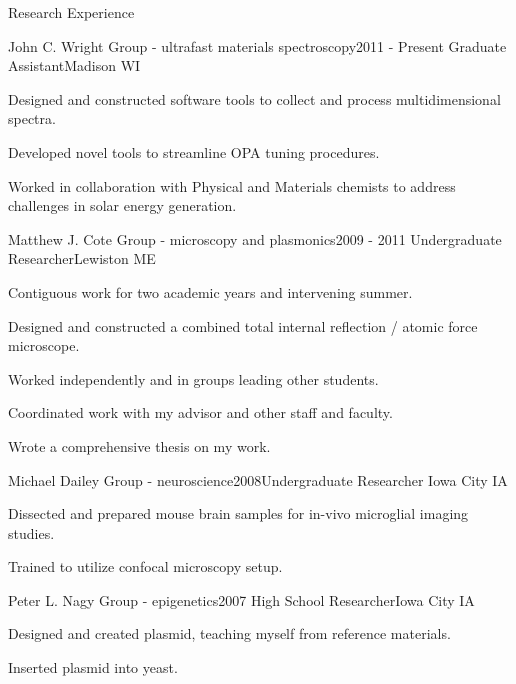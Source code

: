 \documentclass{resume}  %
\begin{document}
\begin{rSection}{Research Experience}
  \begin{rSubsection}{John C. Wright Group - ultrafast materials spectroscopy}{2011 - Present}
    {Graduate Assistant}{Madison WI}
    \item Designed and constructed software tools to collect and process multidimensional spectra.
    \item Developed novel tools to streamline OPA tuning procedures.
    \item Worked in collaboration with Physical and Materials chemists to address challenges in
      solar energy generation.
  \end{rSubsection}
  \begin{rSubsection}{Matthew J. Cote Group - microscopy and plasmonics}{2009 - 2011}
    {Undergraduate Researcher}{Lewiston ME}
    \item Contiguous work for two academic years and intervening summer.
    \item Designed and constructed a combined total internal reflection / atomic force microscope.
    \item Worked independently and in groups leading other students.
    \item Coordinated work with my advisor and other staff and faculty.
    \item Wrote a comprehensive thesis on my work.
  \end{rSubsection}
  \begin{rSubsection}{Michael Dailey Group - neuroscience}{2008}{Undergraduate Researcher}
    {Iowa City IA}
    \item Dissected and prepared mouse brain samples for in-vivo microglial imaging studies.
    \item Trained to utilize confocal microscopy setup.
  \end{rSubsection}
  \begin{rSubsection}{Peter L. Nagy Group - epigenetics}{2007}
    {High School Researcher}{Iowa City IA}
    \item Designed and created plasmid, teaching myself from reference materials.
    \item Inserted plasmid into yeast.
  \end{rSubsection}
\end{rSection}
\end{document}
